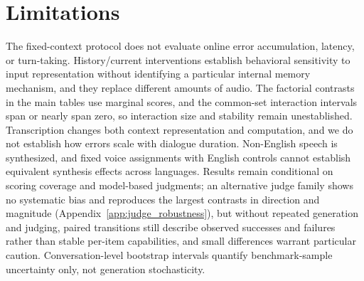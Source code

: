 \documentclass{article}
\begin{document}
\section{Limitations}
\label{app:Limitations}
The fixed-context protocol does not evaluate online error accumulation, latency, or turn-taking. History/current interventions establish behavioral sensitivity to input representation without identifying a particular internal memory mechanism, and they replace different amounts of audio. The factorial contrasts in the main tables use marginal scores, and the common-set interaction intervals span or nearly span zero, so interaction size and stability remain unestablished. Transcription changes both context representation and computation, and we do not establish how errors scale with dialogue duration. Non-English speech is synthesized, and fixed voice assignments with English controls cannot establish equivalent synthesis effects across languages. Results remain conditional on scoring coverage and model-based judgments; an alternative judge family shows no systematic bias and reproduces the largest contrasts in direction and magnitude (Appendix~\ref{app:judge_robustness}), but without repeated generation and judging, paired transitions still describe observed successes and failures rather than stable per-item capabilities, and small differences warrant particular caution. Conversation-level bootstrap intervals quantify benchmark-sample uncertainty only, not generation stochasticity.
\end{document}
